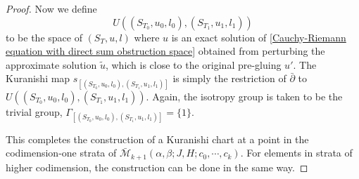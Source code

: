 \documentclass{amsart}
\numberwithin{equation}{section}
\numberwithin{figure}{section}
\begin{document}
\begin{proof}
	Now we define
\begin{equation}
U((S_{T_{0}}, u_{0}, l_{0}), (S_{T_{1}}, u_{1}, l_{1}))
\end{equation}
to be the space of $(S_{T}, u, l)$ where $u$ is an exact solution of \eqref{Cauchy-Riemann equation with direct sum obstruction space} obtained from perturbing the approximate solution $\tilde{u}$, which is close to the original pre-gluing $u'$. The Kuranishi map $s_{[(S_{T_{0}}, u_{0}, l_{0}), (S_{T_{1}}, u_{1}, l_{1})]}$ is simply the restriction of $\bar{\partial}$ to $U((S_{T_{0}}, u_{0}, l_{0}), (S_{T_{1}}, u_{1}, l_{1}))$. Again, the isotropy group is taken to be the trivial group, $\Gamma_{[(S_{T_{0}}, u_{0}, l_{0}), (S_{T_{1}}, u_{1}, l_{1})]} = \{1\}$. \par
	 This completes the construction of a Kuranishi chart at a point in the codimension-one strata of $\bar{\mathcal{M}}_{k+1}(\alpha, \beta; J, H; c_{0}, \cdots, c_{k})$. For elements in strata of higher codimension, the construction can be done in the same way. \par
\end{proof}
\end{document}
